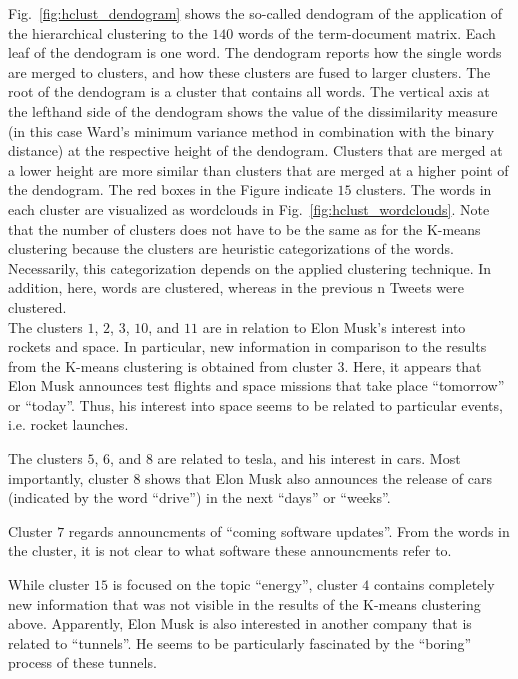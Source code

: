 Fig.~\ref{fig:hclust_dendogram} shows the so-called dendogram of the application of the hierarchical clustering to the $140$ words of the term-document matrix. Each leaf of the dendogram is one word. The dendogram reports how the single words are merged to clusters, and how these clusters are fused to larger clusters. The root of the dendogram is a cluster that contains all words. The vertical axis at the lefthand side of the dendogram shows the value of the dissimilarity measure (in this case Ward's minimum variance method in combination with the binary distance) at the respective height of the dendogram. Clusters that are merged at a lower height are more similar than clusters that are merged at a higher point of the dendogram. The red boxes in the Figure indicate $15$ clusters. The words in each cluster are visualized as wordclouds in Fig.~\ref{fig:hclust_wordclouds}. Note that the number of clusters does not have to be the same as for the K-means clustering because the clusters are heuristic categorizations of the words. Necessarily, this categorization depends on the applied clustering technique. In addition, here, words are clustered, whereas in the previous n Tweets were clustered. \\

The clusters $1$, $2$, $3$, $10$, and $11$ are in relation to Elon Musk's interest into rockets and space. In particular, new information in comparison to the results from the K-means clustering is obtained from cluster $3$. Here, it appears that Elon Musk announces test flights and space missions that take place \enquote{tomorrow} or \enquote{today}. Thus, his interest into space seems to be related to particular events, i.e. rocket launches.

The clusters $5$, $6$, and $8$ are related to tesla, and his interest in cars. Most importantly, cluster $8$ shows that Elon Musk also announces the release of cars (indicated by the word \enquote{drive}) in the next \enquote{days} or \enquote{weeks}.

Cluster $7$ regards announcments of \enquote{coming software updates}. From the words in the cluster, it is not clear to what software these announcments refer to.

While cluster $15$ is focused on the topic \enquote{energy}, cluster $4$ contains completely new information that was not visible in the results of the K-means clustering above. Apparently, Elon Musk is also interested in another company that is related to \enquote{tunnels}. He seems to be particularly fascinated by the \enquote{boring} process of these tunnels.

